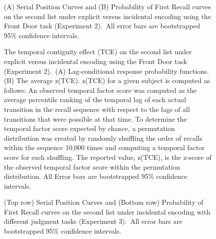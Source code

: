 \documentclass[man,natbib,floatsintext]{apa6} %
\begin{document}
\newcommand\spcpaneltext{~All error bars are bootstrapped 95\% confidence intervals.}


\newcommand\paneltext{~(A) Lag-conditional response probability functions. (B) The average z(TCE). z(TCE) for a given subject is computed as follows: An observed temporal factor score was computed as the average percentile ranking of the temporal lag of each actual transition in the recall sequence with respect to the lags of all transitions that were possible at that time. To determine the temporal factor score expected by chance, a permutation distribution was created by randomly shuffling the order of recalls within the sequence 10,000 times and computing a temporal factor score for each shuffling. The reported value, z(TCE), is the z-score of the observed temporal factor score within the permutation distribution. All Error bars are bootstrapped 95\% confidence intervals.}

\begin{figure}
\caption{(A) Serial Position Curves and (B) Probability of First Recall curves on the second list under explicit versus incidental encoding using the Front Door task (Experiment 2).\spcpaneltext}
\label{e2_l2_spc}
\end{figure}


\begin{figure}%
\caption{The temporal contiguity effect (TCE) on the second list under explicit versus incidental encoding using the Front Door task (Experiment 2).\paneltext}
\label{e2_l2_crp}
\end{figure}



\begin{figure}
\caption{(Top row) Serial Position Curves and (Bottom row) Probability of First Recall curves on the second list under incidental encoding with different judgment tasks (Experiment 3).\spcpaneltext}
\label{e3_l2_spc}
\end{figure}
\end{document}
